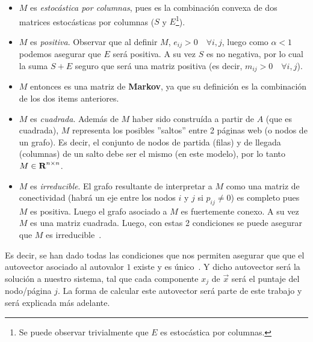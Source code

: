 \begin{itemize}
    \item $M$ es \textit{estoc\'astica por columnas}, pues es la combinaci\'on convexa de
        dos matrices estoc\'asticas por columnas ($S$ y $E$\footnote{Se puede
        observar trivialmente que $E$ es estoc\'astica por columnas.}).

    \item $M$ es \textit{positiva}. Observar que al definir $M$, $e_{ij} >
        0\quad\forall i,j$, luego como $\alpha < 1$ podemos asegurar que $E$
        ser\'a positiva. A su vez $S$ es no negativa, por lo cual la suma $S+E$
        seguro que ser\'a una matriz positiva (es decir, $m_{ij} > 0
        \quad\forall i,j$).\label{itm:m_pos}

    \item $M$ entonces es una matriz de \textbf{Markov}, ya que su definici\'on
        es la combinación de los dos items anteriores.

    \item $M$ es \textit{cuadrada}. Adem\'as de $M$ haber sido constru\'ida a
        partir de $A$ (que es cuadrada), $M$ representa los posibles ''saltos''
        entre 2 p\'aginas web (o nodos de un grafo). Es decir, el conjunto de
        nodos de partida (filas) y de llegada (columnas) de un salto debe ser
        el mismo (en este modelo), por lo tanto $M\in\hbox{\bf R}^{n\times n}$.

    \item $M$ es \textit{irreducible}. El grafo resultante de interpretar a $M$
        como una matriz de conectividad (habr\'a un eje entre los nodos $i$ y
        $j$ si $p_{ij}\neq 0$) es completo pues $M$ es positiva.  Luego el grafo
        asociado a $M$ es fuertemente conexo. A su vez $M$ es una matriz
        cuadrada. Luego, con estas 2 condiciones se puede asegurar que $M$ es
        irreducible~\cite[p.671]{Meyer2000}.
\end{itemize}
\smallskip

\par Es decir, se han dado todas las condiciones que nos permiten asegurar que
que el autovector asociado al autovalor $1$ existe y es
\'unico~\cite[p.663-693]{Meyer2000}. Y dicho autovector ser\'a la soluci\'on a
nuestro sistema, tal que cada componente $x_j$ de $\vec{x}$ ser\'a el
puntaje del nodo/p\'agina $j$. La forma de calcular este autovector ser\'a
parte de este trabajo y ser\'a explicada m\'as adelante.


